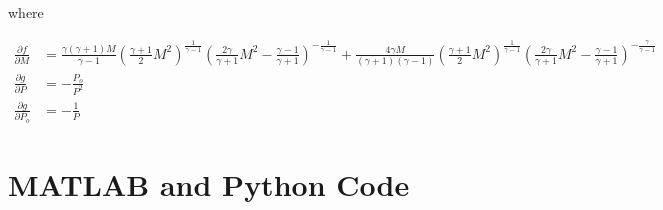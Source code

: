 \documentclass[runningheads]{llncs}
\begin{document}
\noindent
where

\begin{align*}
    \frac{\partial f}{\partial M} &= \frac{\gamma (\gamma + 1) M}{\gamma - 1}\left(\frac{\gamma + 1}{2}M^2\right)^\frac{1}{\gamma - 1}\left(\frac{2\gamma}{\gamma + 1}M^2 - \frac{\gamma - 1}{\gamma + 1}\right)^{-\frac{1}{\gamma - 1}} + \frac{4\gamma M}{(\gamma + 1)(\gamma - 1)}\left(\frac{\gamma + 1}{2}M^2\right)^\frac{1}{\gamma - 1}\left(\frac{2\gamma}{\gamma + 1}M^2 - \frac{\gamma - 1}{\gamma + 1}\right)^{-\frac{\gamma}{\gamma - 1}} \\
    \frac{\partial g}{\partial P} &= -\frac{P_o}{P^2} \\
    \frac{\partial g}{\partial P_o} &= -\frac{1}{P}
\end{align*}

\section{MATLAB and Python Code}
\end{document}
